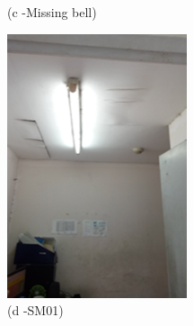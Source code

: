 \begin{figure}
\begin{minipage}[b]{0.2\linewidth}
		\caption*{(c -Missing bell)}
	\end{minipage}
	\hspace{0.05cm}
\begin{minipage}[b]{0.2\linewidth}
	\centering
		\includegraphics[width=\textwidth]{figures/fig_ch04_fdas_sm01}
	\caption*{(d -SM01)}
\end{minipage}
	\hspace{0.05cm}
\begin{minipage}[b]{0.2\linewidth}
	\centering

\end{minipage}
\end{figure}
